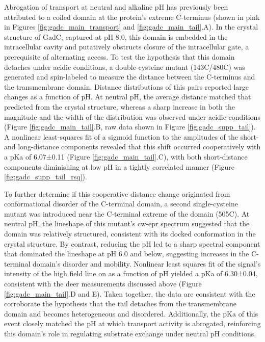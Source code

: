 Abrogation of transport at neutral and alkaline pH has previously been attributed to a coiled domain at the protein's extreme C-terminus (shown in pink in Figures \ref{fig:gadc_main_transport} and \ref{fig:gadc_main_tail}.A). In the crystal structure of GadC, captured at pH 8.0, this domain is embedded in the intracellular cavity and putatively obstructs closure of the intracellular gate, a prerequisite of alternating access. To test the hypothesis that this domain detaches under acidic conditions, a double-cysteine mutant (143C/480C) was generated and spin-labeled to measure the distance between the C-terminus and the transmembrane domain.  Distance distributions of this pairs reported large changes as a function of pH.  At neutral pH, the average distance matched that predicted from the crystal structure, whereas a sharp increase in both the magnitude and the width of the distribution was observed under acidic conditions (Figure \ref{fig:gadc_main_tail}.B, raw data shown in Figure \ref{fig:gadc_supp_tail}). A nonlinear least-squares fit of a sigmoid function to the amplitudes of the short- and long-distance components revealed that this shift occurred cooperatively with a pKa of 6.07±0.11 (Figure \ref{fig:gadc_main_tail}.C), with both short-distance components diminishing at low pH in a tightly correlated manner (Figure \ref{fig:gadc_supp_tail_rsq}).

To further determine if this cooperative distance change originated from  conformational disorder of the C-terminal domain, a second single-cysteine mutant was introduced near the C-terminal extreme of the domain (505C). At neutral pH, the lineshape of this mutant's \gls{cw}-\gls{epr} spectrum suggested that the domain was relatively structured, consistent with its docked conformation in the crystal structure. By contrast, reducing the pH led to a sharp spectral component that dominated the lineshape at pH 6.0 and below, suggesting increases in the C-terminal domain's disorder and mobility. Nonlinear least squares fit of the signal's intensity of the high field line on as a function of pH yielded a pKa of 6.30±0.04, consistent with the \gls{deer} measurements discussed above (Figure \ref{fig:gadc_main_tail}.D and E). Taken together, the data are consistent with the corroborate the hypothesis that the tail detaches from the transmembrane domain and becomes heterogeneous and disordered. Additionally, the pKa of this event closely matched the pH at which transport activity is abrogated, reinforcing this domain’s role in regulating substrate exchange under neutral pH conditions.
	
